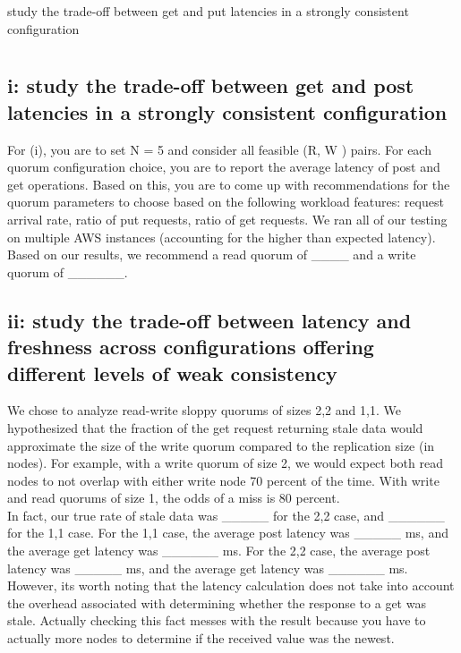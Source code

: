 \documentclass[12pt,letter]{article}
\begin{document}
study the trade-off between get and put latencies in a strongly consistent configuration

\onehalfspacing
\section*{}
\subsection*{i: study the trade-off between get and post latencies in a strongly consistent configuration}
For (i), you are to set N = 5 and consider all feasible (R, W ) pairs. For each quorum configuration choice, you are to report the average latency of post and get operations. Based on this, you are to come up with recommendations for the quorum parameters to choose based on the following workload features: request arrival rate, ratio of put requests, ratio of get requests.
We ran all of our testing on multiple AWS instances (accounting for the higher than expected latency). Based on our results, we recommend a read quorum of ____ and a write quorum of ______.\\

\subsection*{ii: study the trade-off between latency and freshness across configurations offering different levels of weak consistency}
We chose to analyze read-write sloppy quorums of sizes 2,2 and 1,1. We hypothesized that the fraction of the get request returning stale data would approximate the size of the write quorum compared to the replication size (in nodes). For example, with a write quorum of size 2, we would expect both read nodes to not overlap with either write node 70 percent of the time. With write and read quorums of size 1, the odds of a miss is 80 percent.\\

\onehalfspacing
In fact, our true rate of stale data was _____ for the 2,2 case, and ______ for the 1,1 case. For the 1,1 case, the average post latency was _____ ms, and the average get latency was ______ ms. For the 2,2 case, the average post latency was _____ ms, and the average get latency was ______ ms. However, its worth noting that the latency calculation does not take into account the overhead associated with determining whether the response to a get was stale. Actually checking this fact messes with the result because you have to actually more nodes to determine if the received value was the newest. 
\end{document}
